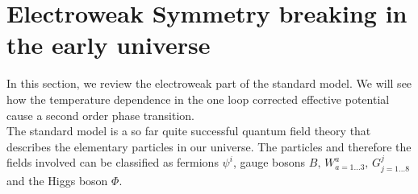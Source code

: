\documentclass{article}
\numberwithin{equation}{section}
\begin{document}



\section{Electroweak Symmetry breaking in the early universe}

In this section, we review the electroweak part of the standard model. We will see how the temperature dependence in the one loop corrected effective potential cause a second order phase transition. \\
\hspace{1cm}
The standard model is a so far quite successful quantum field theory that describes the elementary particles in our universe. 
The particles and therefore the fields involved can be classified as fermions $\psi^{i}$, gauge bosons $B, \,W^{a}_{a = 1\dots 3}, \, G^j_{j = 1\dots 8}$ and the Higgs boson $\Phi$. 
\end{document}
